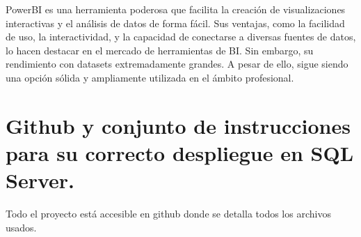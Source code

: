 \documentclass[12pt, a4paper, twoside]{article}
\begin{document}
	PowerBI es una herramienta poderosa que facilita la creación de visualizaciones interactivas y el análisis de datos de forma fácil. Sus ventajas, como la facilidad de uso, la interactividad, y la capacidad de conectarse a diversas fuentes de datos, lo hacen destacar en el mercado de herramientas de BI. Sin embargo, su rendimiento con datasets extremadamente grandes. A pesar de ello, sigue siendo una opción sólida y ampliamente utilizada en el ámbito profesional.
	
	
	\section{Github y conjunto de instrucciones para su correcto despliegue en SQL Server.}

	Todo el proyecto está accesible en github \cite{depab2024} donde se detalla todos los archivos usados.
	\printbibliography
	
	
	
	
\end{document}
